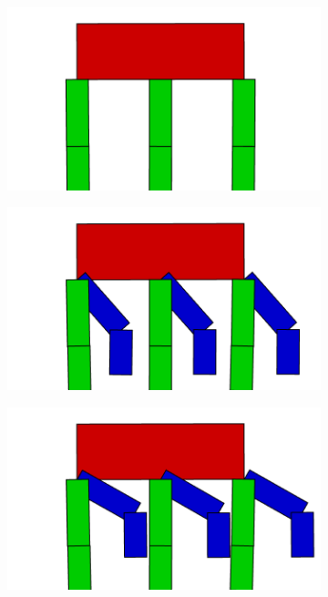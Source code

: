       \begin{figure}[H]
        \centering

        \begin{subfigure}[b]{0.3\textwidth}
          \includegraphics[width=\linewidth,center]{graphics/movement/00}
          \caption{\label{fig:ConceptMovement00}}
        \end{subfigure}
        \hspace{\fill}
        \begin{subfigure}[b]{0.3\textwidth}
          \includegraphics[width=\linewidth,center]{graphics/movement/05}
          \caption{\label{fig:ConceptMovement05}}
        \end{subfigure}
        \hspace{\fill}
        \begin{subfigure}[b]{0.3\textwidth}
          \includegraphics[width=\linewidth,center]{graphics/movement/10}
          \caption{\label{fig:ConceptMovement10}}
        \end{subfigure}


\end{figure}

